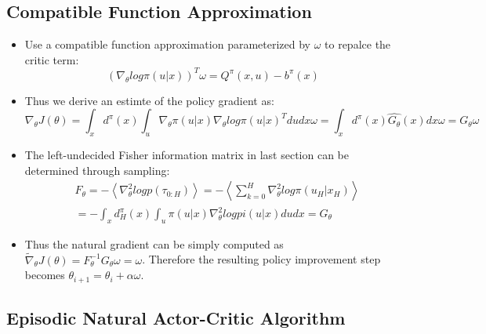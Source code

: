 {\begin{pcolumn}
{\begin{itemize}
\end{itemize}
\vspace*{2mm}
}

\subsection{Compatible Function Approximation}
\vspace*{-17mm}
%
{\large
\begin{itemize}
	\item Use a compatible function approximation parameterized by $\omega$ to repalce the critic term:
\begin{equation}
	(\nabla_\theta log \pi(u | x))^T \omega = Q^\pi(x, u) - b^\pi(x)
\end{equation}
	\item  Thus we derive an estimte of the policy gradient as:
\begin{equation}
	\nabla_\theta J(\theta) = \int_x d^\pi(x) \int_u \nabla_\theta \pi(u | x)\nabla_\theta log \pi(u|x)^T dudx\omega = \int_x d^\pi(x)\hat{G_\theta}(x)dx\omega = G_\theta \omega
\end{equation}
	\item The left-undecided Fisher information matrix in last section can be determined through sampling:
\begin{eqnarray}
	& F_\theta = -\left<\nabla_\theta^2 log p(\tau_{0:H})\right> = -\left<\sum_{k=0}^H \nabla_\theta^2 log \pi(u_H | x_H)\right>  \nonumber \\
	& = - \int_x d_H^\pi (x) \int_u \pi(u|x) \nabla_\theta^2 log pi(u|x)dudx = G_\theta
\end{eqnarray}
	\item Thus the natural gradient can be simply computed as $\widetilde \nabla_\theta J(\theta) = F_\theta^{-1}G_\theta \omega = \omega$. Therefore the resulting policy improvement step becomes $\theta_{i+1} = \theta_i + \alpha\omega$.
\end{itemize}
\vspace*{2mm}
}
\subsection{Episodic Natural Actor-Critic Algorithm}
\end{pcolumn}
%
\hfill
\begin{pcolumn}
%


\end{pcolumn}}
